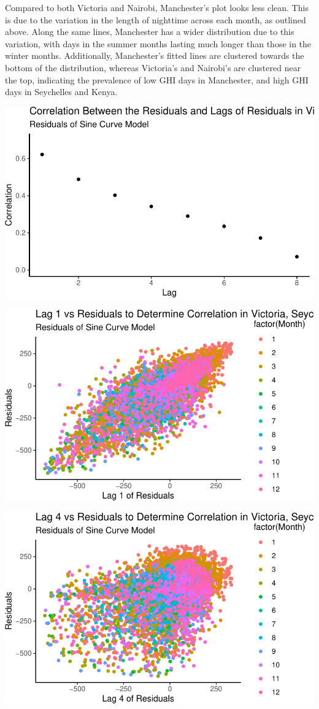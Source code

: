 \documentclass[
  letterpaper,
  DIV=11,
  numbers=noendperiod]{scrartcl}
\begin{document}
Compared to both Victoria and Nairobi, Manchester's plot looks less
clean. This is due to the variation in the length of nighttime across
each month, as outlined above. Along the same lines, Manchester has a
wider distribution due to this variation, with days in the summer months
lasting much longer than those in the winter months. Additionally,
Manchester's fitted lines are clustered towards the bottom of the
distribution, whereas Victoria's and Nairobi's are clustered near the
top, indicating the prevalence of low GHI days in Manchester, and high
GHI days in Seychelles and Kenya.

\includegraphics{FinalReport_files/figure-pdf/unnamed-chunk-6-1.pdf}

\includegraphics{FinalReport_files/figure-pdf/unnamed-chunk-6-2.pdf}

\includegraphics{FinalReport_files/figure-pdf/unnamed-chunk-6-3.pdf}
\end{document}
